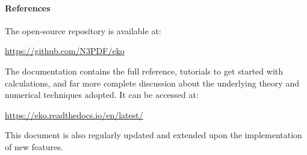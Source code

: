\paragraph{References} The open-source repository is available at:
\begin{center}
\url{https://github.com/N3PDF/eko}
\end{center}
The \eko documentation contains the full \api reference, tutorials to get
started with \eko calculations, and far more complete discussion about the
underlying theory and numerical techniques adopted.
It can be accessed at:
\begin{center}
\url{https://eko.readthedocs.io/en/latest/}
\end{center}
This document is also regularly updated and extended upon the
implementation of new features.
